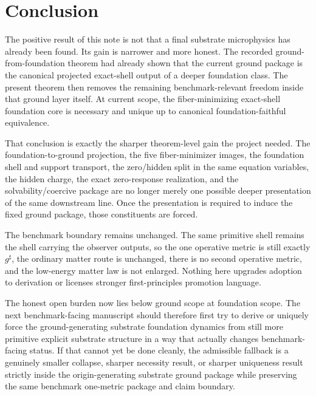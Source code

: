 \documentclass[11pt]{article}
\newcommand{\CompletedMetric}{g^{\sharp}}
\begin{document}
\section{Conclusion}

The positive result of this note is not that a final substrate microphysics has already been found. Its gain is narrower and more honest. The recorded ground-from-foundation theorem had already shown that the current ground package is the canonical projected exact-shell output of a deeper foundation class. The present theorem then removes the remaining benchmark-relevant freedom inside that ground layer itself. At current scope, the fiber-minimizing exact-shell foundation core is necessary and unique up to canonical foundation-faithful equivalence.

That conclusion is exactly the sharper theorem-level gain the project needed. The foundation-to-ground projection, the five fiber-minimizer images, the foundation shell and support transport, the zero/hidden split in the same equation variables, the hidden charge, the exact zero-response realization, and the solvability/coercive package are no longer merely one possible deeper presentation of the same downstream line. Once the presentation is required to induce the fixed ground package, those constituents are forced.

The benchmark boundary remains unchanged. The same primitive shell remains the shell carrying the observer outputs, so the one operative metric is still exactly \(\CompletedMetric\), the ordinary matter route is unchanged, there is no second operative metric, and the low-energy matter law is not enlarged. Nothing here upgrades adoption to derivation or licenses stronger first-principles promotion language.

The honest open burden now lies below ground scope at foundation scope. The next benchmark-facing manuscript should therefore first try to derive or uniquely force the ground-generating substrate foundation dynamics from still more primitive explicit substrate structure in a way that actually changes benchmark-facing status. If that cannot yet be done cleanly, the admissible fallback is a genuinely smaller collapse, sharper necessity result, or sharper uniqueness result strictly inside the origin-generating substrate ground package while preserving the same benchmark one-metric package and claim boundary.
\end{document}
